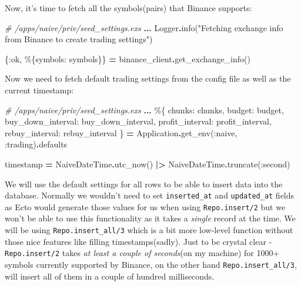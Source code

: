 \documentclass[
]{book}
\newenvironment{Shaded}{\begin{snugshade}}{\end{snugshade}}
\newcommand{\CommentTok}[1]{\textcolor[rgb]{0.56,0.35,0.01}{\textit{#1}}}
\newcommand{\ConstantTok}[1]{\textcolor[rgb]{0.00,0.00,0.00}{#1}}
\newcommand{\NormalTok}[1]{#1}
\newcommand{\OperatorTok}[1]{\textcolor[rgb]{0.81,0.36,0.00}{\textbf{#1}}}
\newcommand{\StringTok}[1]{\textcolor[rgb]{0.31,0.60,0.02}{#1}}
\newcommand{\VariableTok}[1]{\textcolor[rgb]{0.00,0.00,0.00}{#1}}
\begin{document}
Now, it's time to fetch all the symbols(pairs) that Binance supports:

\begin{Shaded}
\begin{Highlighting}[]
\CommentTok{\# /apps/naive/priv/seed\_settings.exs}
\OperatorTok{...}
\ConstantTok{Logger}\OperatorTok{.}\NormalTok{info(}\StringTok{"Fetching exchange info from Binance to create trading settings"}\NormalTok{)}

\NormalTok{\{}\VariableTok{:ok}\NormalTok{, \%\{}\VariableTok{symbols:}\NormalTok{ symbols\}\} }\OperatorTok{=}\NormalTok{ binance\_client}\OperatorTok{.}\NormalTok{get\_exchange\_info()}
\end{Highlighting}
\end{Shaded}

Now we need to fetch default trading settings from the config file as well as the current timestamp:

\begin{Shaded}
\begin{Highlighting}[]
\CommentTok{\# /apps/naive/priv/seed\_settings.exs}
\OperatorTok{...}
\NormalTok{\%\{}
  \VariableTok{chunks:}\NormalTok{ chunks,}
  \VariableTok{budget:}\NormalTok{ budget,}
  \VariableTok{buy\_down\_interval:}\NormalTok{ buy\_down\_interval,}
  \VariableTok{profit\_interval:}\NormalTok{ profit\_interval,}
  \VariableTok{rebuy\_interval:}\NormalTok{ rebuy\_interval}
\NormalTok{\} }\OperatorTok{=} \ConstantTok{Application}\OperatorTok{.}\NormalTok{get\_env(}\VariableTok{:naive}\NormalTok{, }\VariableTok{:trading}\NormalTok{)}\OperatorTok{.}\NormalTok{defaults}

\NormalTok{timestamp }\OperatorTok{=} \ConstantTok{NaiveDateTime}\OperatorTok{.}\NormalTok{utc\_now()}
  \OperatorTok{|\textgreater{}} \ConstantTok{NaiveDateTime}\OperatorTok{.}\NormalTok{truncate(}\VariableTok{:second}\NormalTok{)}
\end{Highlighting}
\end{Shaded}

We will use the default settings for all rows to be able to insert data into the database. Normally we wouldn't need to set \texttt{inserted\_at} and \texttt{updated\_at} fields as Ecto would generate those values for us when using \texttt{Repo.insert/2} but we won't be able to use this functionality as it takes a \emph{single} record at the time. We will be using \texttt{Repo.insert\_all/3} which is a bit more low-level function without those nice features like filling timestamps(sadly). Just to be crystal clear - \texttt{Repo.insert/2} takes \emph{at least a couple of seconds}(on my machine) for 1000+ symbols currently supported by Binance, on the other hand \texttt{Repo.insert\_all/3}, will insert all of them in a couple of hundred milliseconds.
\end{document}
